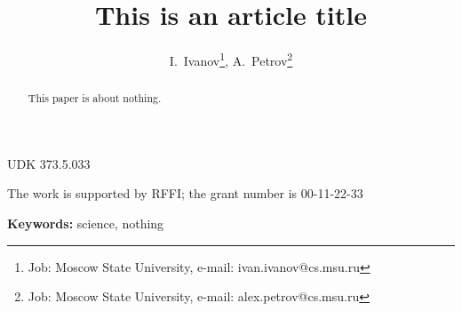 

\title{
	This is an article title
}

\author{
	I.~Ivanov\footnote{
		Job: Moscow State University,
		e-mail: ivan.ivanov@cs.msu.ru
	},
	A.~Petrov\footnote{
		Job: Moscow State University,
		e-mail: alex.petrov@cs.msu.ru
	}
}

\date{}

\maketitle


UDK 373.5.033

The work is supported by RFFI; the grant number is 00-11-22-33

\begin{abstract}
	This paper is about nothing.
\end{abstract}

\textbf{Keywords:} science, nothing

